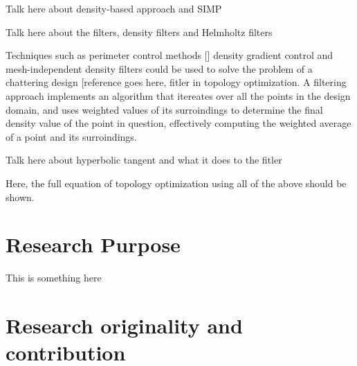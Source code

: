 \documentclass[../main.tex]{subfiles}
\begin{document}
Talk here about density-based approach and SIMP 

Talk here about the filters, density filters and Helmholtz filters

Techniques such as perimeter control methods [] density gradient control 
and mesh-independent density filters could be used to solve the problem of a chattering design [reference goes here, fitler in topology optimization. A filtering approach implements an algorithm that itereates over all the points in the design domain, and uses weighted values of its surroindings to determine the final density value of the point in question, effectively computing the weighted average of a point and its surroindings.

Talk here about hyperbolic tangent and what it does to the fitler

Here, the full equation of topology optimization using all of the above should be shown.

\section{Research Purpose}
 
This is something here

\section{Research originality and contribution}
\end{document}
